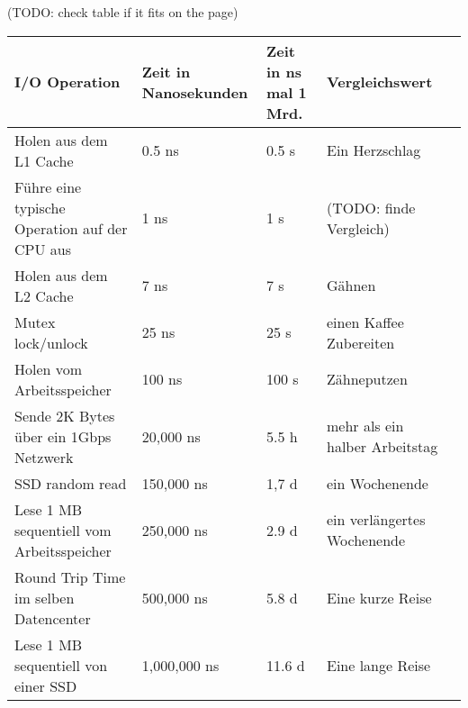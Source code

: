 (TODO: check table if it fits on the page)
\label{subsection: i/o speed}
\begin{table}[h]
\begin{tabular}{@{}lllll@{}}
\toprule
\textbf{I/O Operation}                                     & \textbf{Zeit in Nanosekunden} & \textbf{Zeit in ns mal 1 Mrd.} & \textbf{Vergleichswert}                                    &  \\ \midrule
Holen aus dem L1 Cache                                     & 0.5 ns                        & 0.5 s                          & Ein Herzschlag                                             &  \\
Führe eine typische Operation auf der CPU aus              & 1 ns                          & 1 s                            & (TODO: finde Vergleich)                                    &  \\
Holen aus dem L2 Cache                                     & 7 ns                          & 7 s                            & Gähnen                                                     &  \\
Mutex lock/unlock                                          & 25 ns                         & 25 s                           & einen Kaffee Zubereiten                                    &  \\
Holen vom Arbeitsspeicher                                  & 100 ns                        & 100 s                          & Zähneputzen                                                &  \\
Sende 2K Bytes über ein 1Gbps Netzwerk                     & 20,000 ns                     & 5.5 h                          & mehr als ein halber Arbeitstag                             &  \\
SSD random read                                            & 150,000 ns                    & 1,7 d                          & ein Wochenende                                             &  \\
Lese 1 MB sequentiell vom Arbeitsspeicher                  & 250,000 ns                    & 2.9 d                          & ein verlängertes Wochenende                                &  \\
Round Trip Time im selben Datencenter                      & 500,000 ns                    & 5.8 d                          & Eine kurze Reise                                           &  \\
Lese 1 MB sequentiell von einer SSD                        & 1,000,000 ns                  & 11.6 d                         & Eine lange Reise                                           &  \\

\end{tabular}
\end{table}
